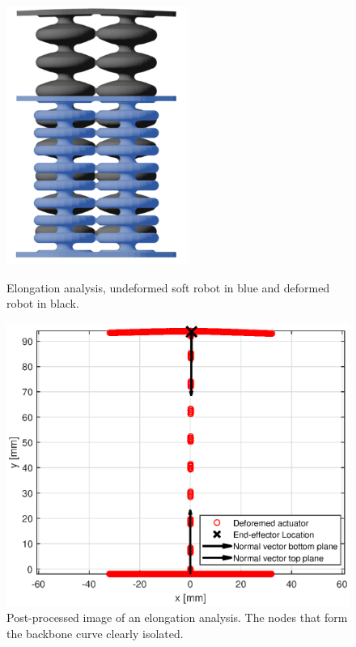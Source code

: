 \begin{figure}[H]
    \centering
\begin{minipage}{0.5\textwidth}
        \centering
        \includegraphics[width=0.53\textwidth]{Figures/Chapter3/elongation.png} 
        \caption{Elongation analysis, undeformed soft robot in blue and deformed robot in black. }
        \label{fig3:schematicelong}
    \end{minipage}\hfill
    \begin{minipage}{0.5\textwidth}
        \centering
        \includegraphics[width=\textwidth]{Figures/Chapter3/elongation60good.eps} 
        \caption{Post-processed image of an elongation analysis. The nodes that form the backbone curve clearly isolated.}

\end{minipage}
\end{figure}
